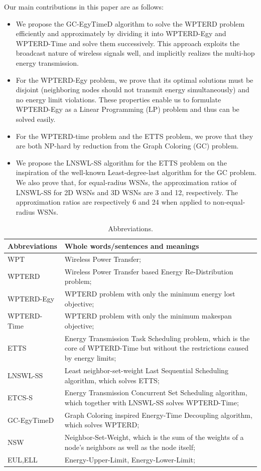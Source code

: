 \documentclass[12pt,journal,onecolumn,draftcls]{IEEEtran}
\begin{document}
Our main contributions in this paper are as follows:

\begin{itemize}
\item{We propose the GC-EgyTimeD algorithm to solve the WPTERD problem efficiently and approximately by dividing it into WPTERD-Egy and WPTERD-Time and solve them successively. This approach exploits the broadcast nature of wireless signals well, and implicitly realizes the multi-hop energy transmission.}
\item{For the WPTERD-Egy problem, we prove that its optimal solutions must be disjoint (neighboring nodes should not transmit energy simultaneously) and no energy limit violations. These properties enable us to formulate WPTERD-Egy as a Linear Programming (LP) problem and thus can be solved easily.}
\item{For the WPTERD-time problem and the ETTS problem, we prove that they are both NP-hard by reduction from the Graph Coloring (GC) problem.}
\item{We propose the LNSWL-SS algorithm for the ETTS problem on the inspiration of the well-known Least-degree-last algorithm for the GC problem. We also prove that, for equal-radius WSNs, the approximation ratios of LNSWL-SS for 2D WSNs and 3D WSNs are 3 and 12, respectively. The approximation ratios are respectively 6 and 24 when applied to non-equal-radius WSNs.}
\end{itemize}


\begin{table}[!htbp]
\caption{Abbreviations.}
\centering
\label{T0}
\footnotesize{
\begin{tabular}
{|p{}|p{}|}
\hline
\hline
\textbf{Abbreviations} & Whole words/sentences and meanings\\
\hline
\hline
WPT & Wireless Power Transfer;\\
\hline
WPTERD & Wireless Power Transfer based Energy Re-Distribution problem;\\
\hline
WPTERD-Egy & WPTERD problem with only the minimum energy lost objective;\\
\hline
WPTERD-Time & WPTERD problem with only the minimum makespan objective;\\
\hline
ETTS & Energy Transmission Task Scheduling problem, which is the core of WPTERD-Time but without the restrictions caused by energy limits;\\
\hline
LNSWL-SS & Least neighbor-set-weight Last Sequential Scheduling algorithm, which solves ETTS;\\
\hline
ETCS-S & Energy Transmission Concurrent Set Scheduling algorithm, which together with LNSWL-SS solves WPTERD-Time;\\
\hline
GC-EgyTimeD & Graph Coloring inspired Energy-Time Decoupling algorithm, which solves WPTERD;\\
\hline
NSW & Neighbor-Set-Weight, which is the sum of the weights of a node's neighbors as well as the node itself;\\
\hline
EUL,ELL & Energy-Upper-Limit, Energy-Lower-Limit;\\
\hline
\hline
\end{tabular}
}
\end{table}
\end{document}
